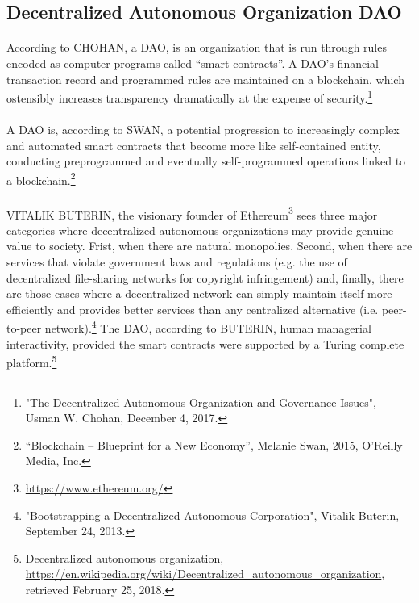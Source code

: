 \documentclass{scrartcl}
\begin{document}
     \subsection{Decentralized Autonomous Organization DAO}
     
     \paragraph{}
     According to CHOHAN, a DAO, is an organization that is run through rules encoded as computer programs called “smart contracts”. A DAO's financial transaction record and programmed rules are maintained on a blockchain, which ostensibly increases transparency dramatically at the expense of security.\footnote{"The Decentralized Autonomous Organization and Governance Issues", Usman W. Chohan, December 4, 2017.}
     
     \paragraph{}
     A DAO is, according to SWAN, a potential progression to increasingly complex and automated smart contracts that become more like self-contained entity, conducting preprogrammed and eventually self-programmed operations linked to a blockchain.\footnote{“Blockchain – Blueprint for a New Economy”, Melanie Swan, 2015, O’Reilly Media, Inc.}
     
     \paragraph{}
     VITALIK BUTERIN, the visionary founder of Ethereum\footnote{\url{https://www.ethereum.org/}} sees three major categories where decentralized autonomous organizations may provide genuine value to society. Frist, when there are natural monopolies. Second, when there are services that violate government laws and regulations (e.g. the use of decentralized file-sharing networks for copyright infringement) and, finally, there are those cases where a decentralized network can simply maintain itself more efficiently and provides better services than any centralized alternative (i.e. peer-to-peer network).\footnote{"Bootstrapping a Decentralized Autonomous Corporation", Vitalik Buterin, September 24, 2013.} The DAO, according to BUTERIN, human managerial interactivity, provided the smart contracts were supported by a Turing complete platform.\footnote{Decentralized autonomous organization, \url{https://en.wikipedia.org/wiki/Decentralized_autonomous_organization}, retrieved February 25, 2018.} 
     
\end{document}
